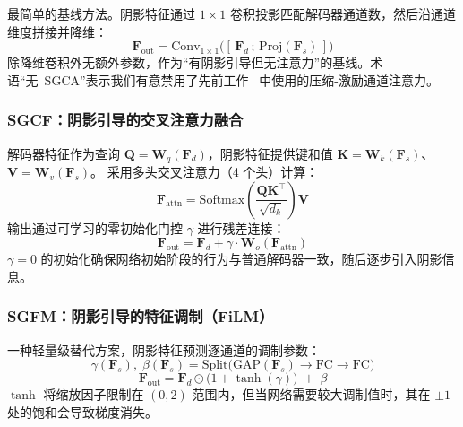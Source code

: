 \documentclass[11pt]{ctexart}
\begin{document}
最简单的基线方法。阴影特征通过 $1\times1$ 卷积投影匹配解码器通道数，然后沿通道维度拼接并降维：
\begin{equation}
  \mathbf{F}_{\text{out}} = \text{Conv}_{1\times1}\big([\,\mathbf{F}_d \,;\, \text{Proj}(\mathbf{F}_s)\,]\big)
\end{equation}
除降维卷积外无额外参数，作为“有阴影引导但无注意力”的基线。术语“无~SGCA”表示我们有意禁用了先前工作~\cite{li2023single} 中使用的压缩-激励通道注意力。

\subsubsection{SGCF：阴影引导的交叉注意力融合}

解码器特征作为查询 $\mathbf{Q} = \mathbf{W}_q(\mathbf{F}_d)$，阴影特征提供键和值 $\mathbf{K} = \mathbf{W}_k(\mathbf{F}_s)$、$\mathbf{V} = \mathbf{W}_v(\mathbf{F}_s)$。
采用多头交叉注意力（4 个头）计算：
\begin{equation}
  \mathbf{F}_{\text{attn}} = \text{Softmax}\!\left(\frac{\mathbf{Q}\mathbf{K}^\top}{\sqrt{d_k}}\right)\mathbf{V}
\end{equation}
输出通过可学习的零初始化门控 $\gamma$ 进行残差连接：
\begin{equation}
  \mathbf{F}_{\text{out}} = \mathbf{F}_d + \gamma \cdot \mathbf{W}_o(\mathbf{F}_{\text{attn}})
\end{equation}
$\gamma=0$ 的初始化确保网络初始阶段的行为与普通解码器一致，随后逐步引入阴影信息。

\subsubsection{SGFM：阴影引导的特征调制（FiLM）}

一种轻量级替代方案，阴影特征预测逐通道的调制参数：
\begin{equation}
  \gamma(\mathbf{F}_s),\; \beta(\mathbf{F}_s) = \text{Split}\big(\text{GAP}(\mathbf{F}_s) \rightarrow \text{FC} \rightarrow \text{FC}\big)
\end{equation}
\begin{equation}
  \mathbf{F}_{\text{out}} = \mathbf{F}_d \odot \big(1 + \tanh(\gamma)\big) \;+\; \beta
\end{equation}
$\tanh$ 将缩放因子限制在 $(0, 2)$ 范围内，但当网络需要较大调制值时，其在 $\pm1$ 处的饱和会导致梯度消失。
\end{document}
